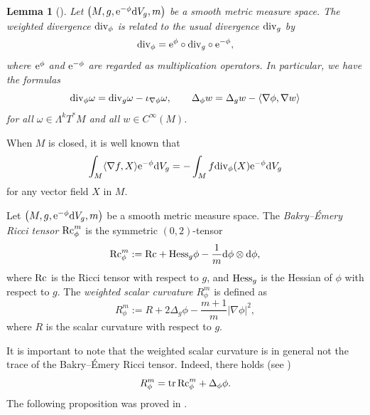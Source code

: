 \documentclass[pdftex]{sigma}
\numberwithin{equation}{section}
\newtheorem{Lemma}[Theorem]{Lemma}
\begin{document}
\begin{Lemma}[{\cite[Lemma 3.5]{Case4}}]
Let $\bigl(M,g,{\rm e}^{-\phi}{\rm d}V_g,m\bigr)$ be a smooth metric measure space.
The weighted divergence ${\rm div}_\phi$ is related to the usual divergence ${\rm div}_g$ by
\begin{equation*}
 {\rm div}_\phi={\rm e}^{\phi}\circ {\rm div}_g\circ {\rm e}^{-\phi},
\end{equation*}
where ${\rm e}^\phi$ and ${\rm e}^{-\phi}$ are regarded as multiplication operators. In particular, we have the formulas%
 \begin{equation*}
 {\rm div}_\phi \omega={\rm div}_g\omega-\iota_{\nabla \phi}\omega,\qquad
 \Delta_\phi w=\Delta_gw-\langle \nabla \phi,\nabla w\rangle
 \end{equation*}
 for all $\omega\in \Lambda^kT^*M$ and all $w\in C^\infty(M)$.
\end{Lemma}

When $M$ is closed, it is well known that
\begin{equation}
\int_M \langle \nabla f,X\rangle {\rm e}^{-\phi}{\rm d}V_g=-\int_M f {\rm div}_\phi(X){\rm e}^{-\phi}{\rm d}V_g \label{IBP}
\end{equation}
for any vector field $X$ in $M$.

\begin{Definition}
 Let $\bigl(M,g,{\rm e}^{-\phi}{\rm d}V_g,m\bigr)$ be a smooth metric measure space. The \textit{Bakry--\'{E}mery Ricci tensor} ${\rm Rc}_\phi^m$ is the symmetric $(0,2)$-tensor
 \begin{equation*}
 {\rm Rc}_\phi^m:={\rm Rc}+{\rm Hess}_g\phi-\frac{1}{m} {\rm d}\phi\otimes {\rm d}\phi,
 \end{equation*}
 where ${\rm Rc}$ is the Ricci tensor with respect to $g$, and ${\rm Hess}_g$ is the Hessian of $\phi$ with respect to $g$.
 The \textit{weighted scalar curvature} $R_\phi^m$ is defined as
 \begin{equation*}
 R_\phi^m:=R+2\Delta_g\phi-\frac{m+1}{m} |\nabla \phi |^2,
 \end{equation*}
 where $R$ is the scalar curvature with respect to $g$.
\end{Definition}
It is important to note that the weighted scalar curvature is in general not the trace of the Bakry--\'{E}mery Ricci tensor. Indeed,
there holds (see \cite[formula~(4.1)]{Case4})
\begin{equation*}%
 R_\phi^m=\operatorname{tr}{\rm Rc}_\phi^m+\Delta_\phi\phi.
\end{equation*}
The following proposition was proved in \cite[Proposition 4.2]{Case4}.
\end{document}
